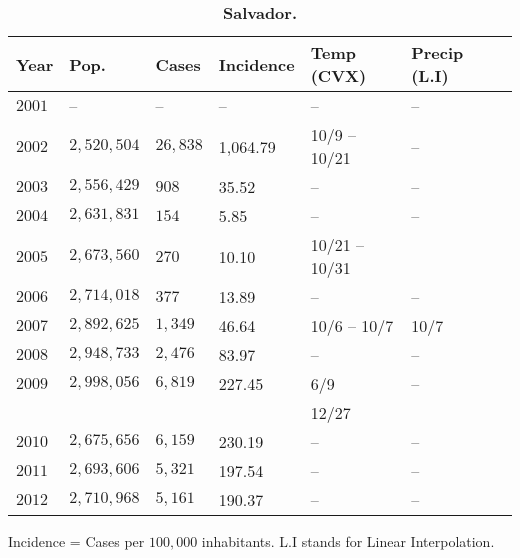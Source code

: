 \documentclass[final,leqno]{siamltexmm2}
\begin{document}
      
\begin{table}[t]
\centering
\caption{
{\bf Salvador.}}
\begin{tabular}{|l|l|l|l|l|l|l|}
\hline
\multicolumn{1}{|l|}{\bf Year} & \multicolumn{1}{|l|}{\bf Pop.} & \multicolumn{1}{|l|}{\bf Cases}&\multicolumn{1}{|l|}{\bf Incidence}&\multicolumn{1}{|l|}{\bf Temp (CVX)}&\multicolumn{1}{|l|}{\bf Precip (L.I)}\\ \hline %
$2001$ & --  &  -- & -- & -- & --    \\ \hline
$2002$ & $2,520,504 $ & $26,838$  & \cellcolor{red!25}1,064.79 & 10/9 -- 10/21 & --  \\ \hline
$2003$ & $2,556,429 $ & $908$  &  \cellcolor{blue!25} 35.52 & -- & -- \\ \hline
$2004$ & $  2,631,831  $ & $154 $   &  \cellcolor{blue!25}  5.85 & -- &  -- \\ \hline
$2005$ & $2,673,560$ & $270 $   &  \cellcolor{blue!25}10.10 & 10/21 -- 10/31&  \\ \hline
$2006$ & $2,714,018$ & $ 377$   &  \cellcolor{blue!25}13.89 & -- & -- \\ \hline
$2007$ & $2,892,625 $ & $1,349$    &  \cellcolor{blue!25}46.64 & 10/6 -- 10/7 & 10/7 \\ \hline
$2008$ & $2,948,733$ & $2,476$ &  \cellcolor{blue!25}83.97 & -- & -- \\ \hline
$2009$ & $2,998,056$ & $6,819$  &  \cellcolor{red!25}227.45 &  6/9   & -- \\ 
       &             &          &  \cellcolor{red!25}       &  12/27   & \\ \hline
$2010$ & $2,675,656 $ & $6,159$    &  \cellcolor{red!25}230.19 & -- & -- \\ \hline
$2011$ & $2,693,606 $ & $5,321$  &  \cellcolor{red!25}197.54 & -- & --  \\ \hline
$2012$ & $2,710,968$ & $5,161$  &  \cellcolor{red!25} 190.37 & -- & -- \\ \hline
\end{tabular}
\begin{flushleft} 
\vspace{.5cm}
Incidence = Cases per $100,000$ inhabitants.  L.I stands for Linear Interpolation.
\end{flushleft}
\label{table7}
\end{table} 
\end{document}

